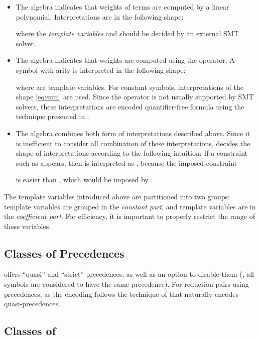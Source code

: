 \documentclass{llncs}
\begin{document}
\begin{itemize}
\item
	The algebra  indicates that
	weights of terms are computed by a linear polynomial.
	Interpretations are in the following shape:
	
	where
	the \emph{template variables}
	 and 
	should be decided by an external SMT solver.
\smallskip
\item
	The algebra  indicates that
	weights are computed using the  operator.
	A symbol  with arity  is interpreted in the following shape:
	
	where  are template variables.
	For constant symbols,
	interpretations of the shape \eqref{eq:sum} are used.
	Since the operator  is not usually supported by SMT solvers,
	these interpretations are encoded  quantifier-free formula using
	the technique presented in \cite{YKS13}.
\smallskip
\item
	The algebra  combines both form of interpretations described above.
	Since it is inefficient to consider all combination of these interpretations,
	 decides the shape of interpretations according to the following
	intuition:
	If a constraint such as  appears, then
	 is interpreted as ,
	because the imposed constraint
	
	is easier than
	, which would be imposed
	by .
\end{itemize}

The template variables introduced above are partitioned into two groups:
template variables  are grouped in the \emph{constant part},
and template variables  are in the \emph{coefficient part}.
For efficiency,
it is important to properly restrict the range of these variables.

\subsection{Classes of Precedences}

\NaTT offers ``quasi'' and ``strict'' precedences, as well as
an option to disable them (\ie,
all symbols are considered to have the same precedence).
For reduction pairs using precedences,
as the encoding follows the technique of \cite{ZHM09}
that naturally encodes quasi-precedences.

\subsection{Classes of }
\end{document}
